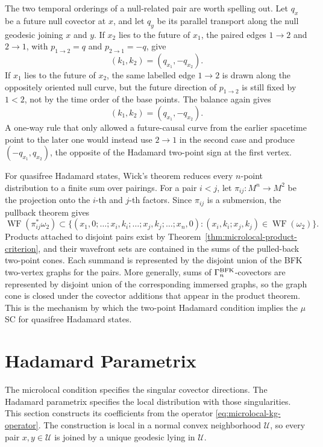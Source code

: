 The two temporal orderings of a null-related pair are worth spelling out.
Let \(q_x\) be a future null covector at \(x\), and let \(q_y\) be its parallel
transport along the null geodesic joining \(x\) and \(y\).  If \(x_2\) lies to
the future of \(x_1\), the paired edges \(1\to2\) and \(2\to1\), with
\(p_{1\to2}=q\) and \(p_{2\to1}=-q\), give
\[
  (k_1,k_2)=(q_{x_1},-q_{x_2}).
\]
If \(x_1\) lies to the future of \(x_2\), the same labelled edge \(1\to2\) is
drawn along the oppositely oriented null curve, but the future direction of
\(p_{1\to2}\) is still fixed by \(1<2\), not by the time order of the base
points.  The balance again gives
\[
  (k_1,k_2)=(q_{x_1},-q_{x_2}).
\]
A one-way rule that only allowed a future-causal curve from the earlier
spacetime point to the later one would instead use \(2\to1\) in the second
case and produce \((-q_{x_1},q_{x_2})\), the opposite of the Hadamard
two-point sign at the first vertex.

For quasifree Hadamard states, Wick's theorem reduces every \(n\)-point
distribution to a finite sum over pairings.  For a pair \(i<j\), let
\(\pi_{ij}:M^n\to M^2\) be the projection onto the \(i\)-th and \(j\)-th
factors.  Since \(\pi_{ij}\) is a submersion, the pullback theorem gives
\[
  \operatorname{WF}(\pi_{ij}^*\omega_2)
  \subset
  \{(x_1,0;\ldots;x_i,k_i;\ldots;x_j,k_j;\ldots;x_n,0):
    (x_i,k_i;x_j,k_j)\in\operatorname{WF}(\omega_2)\}.
\]
Products attached to disjoint pairs exist by
Theorem~\ref{thm:microlocal-product-criterion}, and their wavefront sets are
contained in the sums of the pulled-back two-point cones.  Each summand is
represented by the disjoint union of the BFK two-vertex graphs for the pairs.
More generally, sums of \(\Gamma_n^{\rm BFK}\)-covectors are represented by
disjoint union of the corresponding immersed graphs, so the graph cone is
closed under the covector additions that appear in the product theorem.  This
is the mechanism by which the two-point Hadamard condition implies the
\(\mu\)SC for quasifree Hadamard states.

\section{Hadamard Parametrix}

The microlocal condition specifies the singular covector directions.  The
Hadamard parametrix specifies the local distribution with those singularities.
This section constructs its coefficients from the operator
\eqref{eq:microlocal-kg-operator}.  The construction is local in a normal
convex neighborhood \(\mathcal U\), so every pair \(x,y\in\mathcal U\) is
joined by a unique geodesic lying in \(\mathcal U\).


